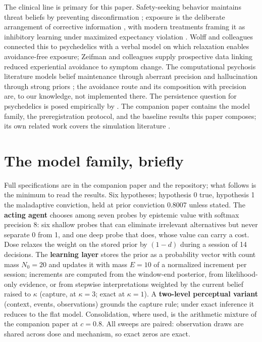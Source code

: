 \documentclass[11pt]{article}
\begin{document}
The clinical line is primary for this paper. Safety-seeking behavior maintains
threat beliefs by preventing disconfirmation \cite{salkovskis1991}; exposure is
the deliberate arrangement of corrective information \cite{foakozak1986}, with
modern treatments framing it as inhibitory learning under maximized expectancy
violation \cite{craske2014}. Wolff and colleagues \cite{wolff2020} connected this
to psychedelics with a verbal model on which relaxation enables avoidance-free
exposure; Zeifman and colleagues \cite{zeifman2020avoid} supply prospective data
linking reduced experiential avoidance to symptom change. The computational
psychosis literature models belief maintenance through aberrant precision
\cite{corlett2010,adams2013,sterzer2018} and hallucination through strong priors
\cite{powers2017}; the avoidance route and its composition with precision are, to
our knowledge, not implemented there. The persistence question for psychedelics
is posed empirically by \cite{zeifman2025}. The companion paper
\cite{rogers2026} contains the model family, the preregistration protocol, and
the baseline results this paper composes; its own related work covers the
simulation literature \cite{rajpal2022,sandved2021,fisher2024,mago2026}.

\section{The model family, briefly}
\label{sec:model}

Full specifications are in the companion paper and the repository; what follows
is the minimum to read the results. Six hypotheses; hypothesis 0 true, hypothesis
1 the maladaptive conviction, held at prior conviction 0.8007 unless stated. The
\textbf{acting agent} chooses among seven probes by epistemic value with softmax
precision 8: six shallow probes that can eliminate irrelevant alternatives but
never separate 0 from 1, and one deep probe that does, whose value can carry a
cost. Dose relaxes the weight on the stored prior by $(1-d)$ during a session of
14 decisions. The \textbf{learning layer} stores the prior as a probability
vector with count mass $N_0 = 20$ and updates it with mass $E = 10$ of a
normalized increment per session; increments are computed from the window-end
posterior, from likelihood-only evidence, or from stepwise interpretations
weighted by the current belief raised to $\kappa$ (capture, at $\kappa = 3$;
exact at $\kappa = 1$). A \textbf{two-level perceptual variant} (context, events,
observations) grounds the capture rule; under exact inference it reduces to the
flat model. Consolidation, where used, is the arithmetic mixture of the companion
paper at $c = 0.8$. All sweeps are paired: observation draws are shared across
dose and mechanism, so exact zeros are exact.
\end{document}
